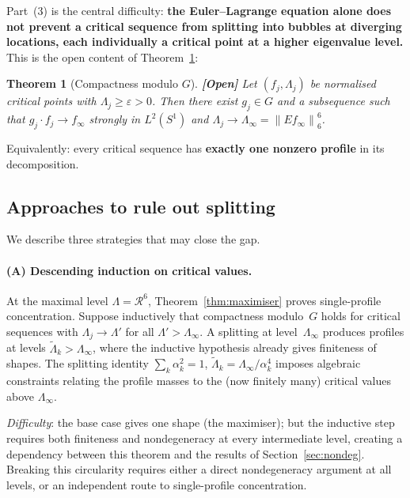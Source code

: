 \documentclass[12pt]{article}
\newtheorem{theorem}{Theorem}[section]
\theoremstyle{definition}
\theoremstyle{remark}
\newcommand{\norm}[1]{\left\|#1\right\|}
\newcommand{\open}{\textbf{\color{red}[Open]}}
\begin{document}
Part~(3) is the central difficulty:
\textbf{the Euler--Lagrange equation alone does not prevent a critical
sequence from splitting into bubbles at diverging locations, each
individually a critical point at a higher eigenvalue level.}
This is the open content of Theorem~\ref{thm:compactness-mod-G}:

\begin{theorem}[Compactness modulo $G$]
  \label{thm:compactness-mod-G}
  \open\quad
  Let $(f_j,\Lambda_j)$ be normalised critical points with
  $\Lambda_j\geq\varepsilon>0$.  Then there exist $g_j\in G$ and a
  subsequence such that $g_j\cdot f_j\to f_\infty$ strongly in
  $L^2(S^1)$ and $\Lambda_j\to\Lambda_\infty=\norm{Ef_\infty}_6^6$.
\end{theorem}

Equivalently: every critical sequence has \textbf{exactly one
nonzero profile} in its decomposition.

\subsection{Approaches to rule out splitting}

We describe three strategies that may close the gap.

\paragraph{(A) Descending induction on critical values.}
At the maximal level $\Lambda=\mathcal R^6$,
Theorem~\ref{thm:maximiser} proves single-profile concentration.
Suppose inductively that compactness modulo~$G$ holds for critical
sequences with $\Lambda_j\to\Lambda'$ for all
$\Lambda'>\Lambda_\infty$.  A splitting at level~$\Lambda_\infty$
produces profiles at levels $\widetilde\Lambda_k>\Lambda_\infty$,
where the inductive hypothesis already gives finiteness of shapes.
The splitting identity $\sum_k\alpha_k^2=1$,
$\widetilde\Lambda_k=\Lambda_\infty/\alpha_k^4$ imposes algebraic
constraints relating the profile masses to the (now finitely many)
critical values above $\Lambda_\infty$.

\emph{Difficulty}: the base case gives one shape (the maximiser);
but the inductive step requires both finiteness and nondegeneracy at
every intermediate level, creating a dependency between this theorem
and the results of Section~\ref{sec:nondeg}.  Breaking this
circularity requires either a direct nondegeneracy argument at all
levels, or an independent route to single-profile concentration.
\end{document}
